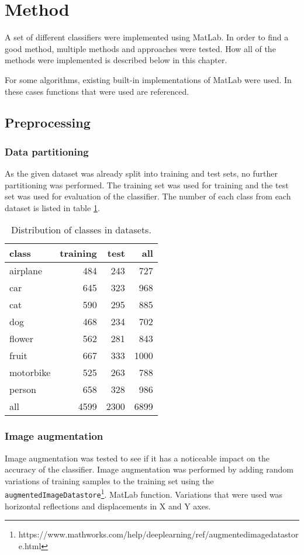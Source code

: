 \documentclass[doc/report.tex]{subfiles}
\begin{document}
\section{Method}
A set of different classifiers were implemented using MatLab. In order to find
a good method, multiple methods and approaches were tested. How all of the
methods were implemented is described below in this chapter.

For some algorithms, existing built-in implementations of MatLab were used. In
these cases functions that were used are referenced.


\subsection{Preprocessing}

\subsubsection{Data partitioning}
As the given dataset was already split into training and test sets, no further
partitioning was performed. The training set was used for training and the test
set was used for evaluation of the classifier. The number of each class from
each dataset is listed in table \ref{tbl:datasets}.

\begin{table}[h]
    \centering
    \begin{tabular}{l|rr|r}
        class & training & test & all \\\hline
        airplane    & 484   & 243   & 727 \\
        car         & 645   & 323   & 968 \\
        cat         & 590   & 295   & 885 \\
        dog         & 468   & 234   & 702 \\
        flower      & 562   & 281   & 843 \\
        fruit       & 667   & 333   & 1000 \\
        motorbike   & 525   & 263   & 788 \\
        person      & 658   & 328   & 986 \\\hline
        all         & 4599  & 2300  & 6899
    \end{tabular}
    \caption{Distribution of classes in datasets.}
    \label{tbl:datasets}
\end{table}

\subsubsection{Image augmentation}
Image augmentation was tested to see if it has a noticeable impact on the
accuracy of the classifier. Image augmentation was performed by adding random
variations of training samples to the training set using the
\texttt{augmentedImageDatastore}\footnote{https://www.mathworks.com/help/deeplearning/ref/augmentedimagedatastore.html}.
MatLab function. Variations that were used was horizontal reflections and
displacements in X and Y axes.
\end{document}
